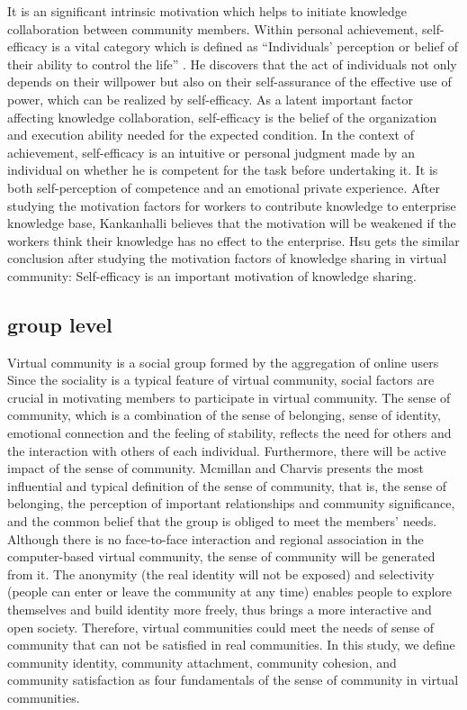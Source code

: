 \documentclass{elsarticle}
\begin{document}
It is an significant intrinsic motivation which
helps to initiate knowledge collaboration between community
members.  Within personal
achievement, self-efficacy is a vital category which is defined as
“Individuals’ perception or belief of their ability to control the
life” \cite{bundura1977slt}. He discovers that the act of individuals not only depends
on their willpower but also on their self-assurance of the effective
use of power, which can be realized by self-efficacy. As a latent
important factor affecting knowledge collaboration, self-efficacy is
the belief of the organization and execution ability needed for the
expected condition. In the context of achievement, self-efficacy is an intuitive
or personal judgment made by an individual on whether he is competent
for the task before undertaking it. It is both self-perception of
competence and an emotional private experience. After studying the
motivation factors for workers to contribute knowledge to enterprise
knowledge base,  Kankanhalli believes that the motivation will be
weakened if the workers think their knowledge has no effect to the
enterprise. Hsu gets the similar conclusion after studying the
motivation factors of knowledge sharing in virtual community:
Self-efficacy is an important motivation of knowledge sharing.

\subsection{group level}
\label{sec:group-level}

Virtual community is a social group formed by the aggregation of online users Since the sociality is a typical feature of virtual community, social factors are crucial in motivating members to participate in virtual community. The sense of community, which is a combination of the sense of belonging, sense of identity, emotional connection and the feeling of stability, reflects the need for others and the interaction with others of each individual. Furthermore, there will be active impact of the sense of community. Mcmillan and Charvis presents the most influential and typical definition of the sense of community, that is, the sense of belonging, the perception of important relationships and community significance, and the common belief that the group is obliged to meet the members’ needs\cite{mcmillan1986scd}. Although there is no face-to-face interaction and regional association in the computer-based virtual community, the sense of community will be generated from it. The anonymity (the real identity will not be exposed) and selectivity (people can enter or leave the community at any time) enables people to explore themselves and build identity more freely, thus brings a more interactive and open society. Therefore, virtual communities could meet the needs of sense of community that can not be satisfied in real communities. In this study, we define community identity, community attachment, community cohesion, and community satisfaction as four fundamentals of the sense of community in virtual communities.      
\end{document}
